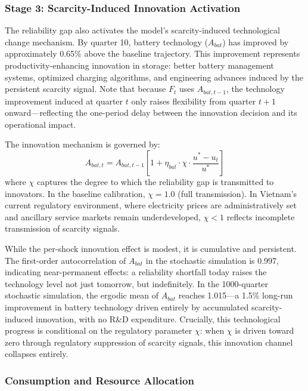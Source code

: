 \documentclass[12pt, a4paper]{article}
\begin{document}
\subsubsection{Stage 3: Scarcity-Induced Innovation Activation}

The reliability gap also activates the model's scarcity-induced technological change mechanism. By quarter 10, battery technology ($A_{bat}$) has improved by approximately 0.65\% above the baseline trajectory. This improvement represents productivity-enhancing innovation in storage: better battery management systems, optimized charging algorithms, and engineering advances induced by the persistent scarcity signal. Note that because $F_t$ uses $A_{bat,t-1}$, the technology improvement induced at quarter $t$ only raises flexibility from quarter $t+1$ onward---reflecting the one-period delay between the innovation decision and its operational impact.

The innovation mechanism is governed by:
\begin{equation}
A_{bat,t} = A_{bat,t-1} \left[1 + \eta_{bat} \cdot \chi \cdot \frac{u^* - u_t}{u^*} \right]
\end{equation}
where $\chi$ captures the degree to which the reliability gap is transmitted to innovators. In the baseline calibration, $\chi = 1.0$ (full transmission). In Vietnam's current regulatory environment, where electricity prices are administratively set and ancillary service markets remain underdeveloped, $\chi < 1$ reflects incomplete transmission of scarcity signals.

While the per-shock innovation effect is modest, it is cumulative and persistent. The first-order autocorrelation of $A_{bat}$ in the stochastic simulation is 0.997, indicating near-permanent effects: a reliability shortfall today raises the technology level not just tomorrow, but indefinitely. In the 1000-quarter stochastic simulation, the ergodic mean of $A_{bat}$ reaches 1.015---a 1.5\% long-run improvement in battery technology driven entirely by accumulated scarcity-induced innovation, with no R\&D expenditure. Crucially, this technological progress is conditional on the regulatory parameter $\chi$: when $\chi$ is driven toward zero through regulatory suppression of scarcity signals, this innovation channel collapses entirely.

\subsubsection{Consumption and Resource Allocation}
\end{document}
